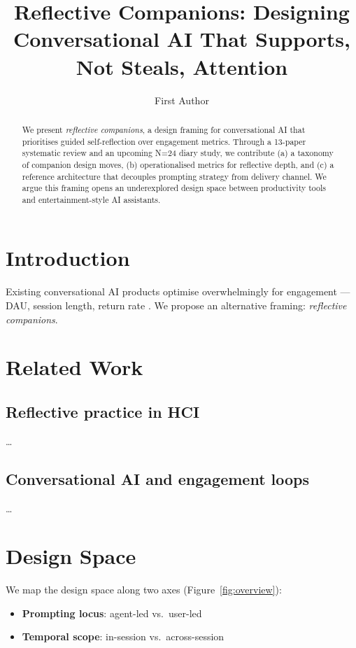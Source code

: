 \documentclass[sigconf,authorversion,nonacm]{acmart}
\title{Reflective Companions: Designing Conversational AI That Supports, Not Steals, Attention}
\author{First Author}
\affiliation{
  \institution{Anonymous University}
  \city{Anonymous City}
  \country{Anonymous Country}
}
\begin{document}
\begin{abstract}
We present \emph{reflective companions}, a design framing for conversational AI that prioritises
guided self-reflection over engagement metrics. Through a 13-paper systematic review and an
upcoming N=24 diary study, we contribute (a) a taxonomy of companion design moves, (b)
operationalised metrics for reflective depth, and (c) a reference architecture that decouples
prompting strategy from delivery channel. We argue this framing opens an underexplored design space
between productivity tools and entertainment-style AI assistants.
\end{abstract}


\maketitle

\section{Introduction}

Existing conversational AI products optimise overwhelmingly for engagement — DAU, session length,
return rate \cite{example2024}. We propose an alternative framing: \emph{reflective companions}.

\section{Related Work}

\subsection{Reflective practice in HCI}
\dots

\subsection{Conversational AI and engagement loops}
\dots

\section{Design Space}

We map the design space along two axes (Figure~\ref{fig:overview}):
\begin{itemize}
  \item \textbf{Prompting locus}: agent-led vs.\ user-led
  \item \textbf{Temporal scope}: in-session vs.\ across-session
\end{itemize}
\end{document}
